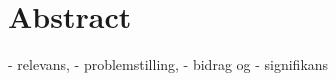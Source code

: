 \documentclass[thesis.tex]{subfiles}
\begin{document}
\chapter*{Abstract}
\label{chap:abstract}
 - relevans,
 - problemstilling,
 - bidrag og
 - signifikans
\end{document}
